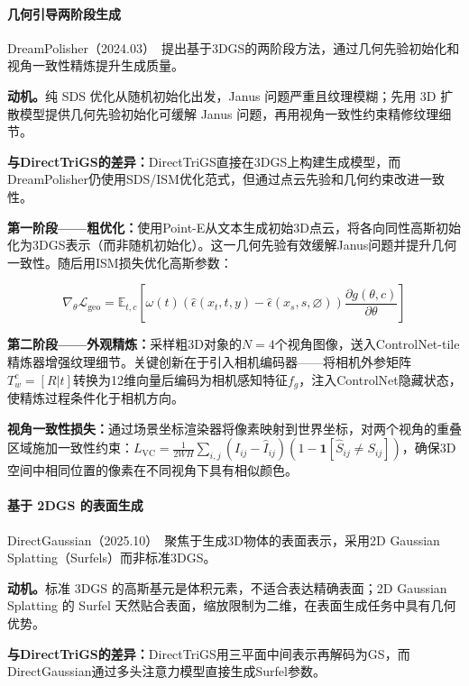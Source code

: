 \paragraph{几何引导两阶段生成}

DreamPolisher（2024.03）~\cite{2403_17237}提出基于3DGS的两阶段方法，通过几何先验初始化和视角一致性精炼提升生成质量。

\textbf{动机。}纯 SDS 优化从随机初始化出发，Janus 问题严重且纹理模糊；先用 3D 扩散模型提供几何先验初始化可缓解 Janus 问题，再用视角一致性约束精修纹理细节。

\textbf{与DirectTriGS的差异：}DirectTriGS直接在3DGS上构建生成模型，而DreamPolisher仍使用SDS/ISM优化范式，但通过点云先验和几何约束改进一致性。

\textbf{第一阶段——粗优化：}使用Point-E从文本生成初始3D点云，将各向同性高斯初始化为3DGS表示（而非随机初始化）。这一几何先验有效缓解Janus问题并提升几何一致性。随后用ISM损失优化高斯参数：

\begin{equation}
\nabla_\theta \mathcal{L}_\text{geo} = \mathbb{E}_{t,c}\left[\omega(t)(\hat{\epsilon}(x_t,t,y) - \hat{\epsilon}(x_s,s,\varnothing))\frac{\partial g(\theta,c)}{\partial \theta}\right]
\end{equation}

\textbf{第二阶段——外观精炼：}采样粗3D对象的$N=4$个视角图像，送入ControlNet-tile精炼器增强纹理细节。关键创新在于引入相机编码器——将相机外参矩阵$T_w^c = [R|t]$转换为12维向量后编码为相机感知特征$f_g$，注入ControlNet隐藏状态，使精炼过程条件化于相机方向。

\textbf{视角一致性损失：}通过场景坐标渲染器将像素映射到世界坐标，对两个视角的重叠区域施加一致性约束：$L_\text{VC} = \frac{1}{2WH}\sum_{i,j}(I_{ij} - \hat{I}_{ij})(1-\mathbf{1}[\hat{S}_{ij} \neq S_{ij}])$，确保3D空间中相同位置的像素在不同视角下具有相似颜色。

\paragraph{基于 2DGS 的表面生成}

DirectGaussian（2025.10）~\cite{2510_06967}聚焦于生成3D物体的表面表示，采用2D Gaussian Splatting（Surfels）而非标准3DGS。

\textbf{动机。}标准 3DGS 的高斯基元是体积元素，不适合表达精确表面；2D Gaussian Splatting 的 Surfel 天然贴合表面，缩放限制为二维，在表面生成任务中具有几何优势。

\textbf{与DirectTriGS的差异：}DirectTriGS用三平面中间表示再解码为GS，而DirectGaussian通过多头注意力模型直接生成Surfel参数。

